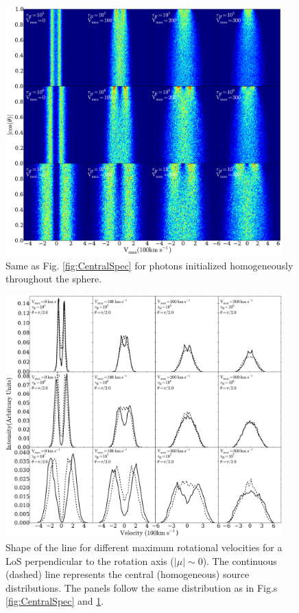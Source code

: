 \documentclass{emulateapj}
\newcommand{\ly}{{\ifmmode{{\rm Ly}\alpha~}\else{Ly$\alpha$~}\fi}}
\begin{document}
\begin{figure}
\begin{center}
  \includegraphics[width=0.95\textwidth]{f3.pdf}
\end{center}
\caption{Same as Fig. \ref{fig:CentralSpec} for \ly photons
  initialized homogeneously throughout the sphere.
    \label{fig:HomSpec}}  
\end{figure}

\begin{figure}
\begin{center}
  \includegraphics[width=0.95\textwidth]{f4.pdf}
\end{center}
\caption{Shape of the \ly line for different maximum rotational
  velocities for a LoS perpendicular to the rotation axis
  ($|\mu|\sim 0$). The continuous (dashed) line represents the central
  (homogeneous) source distributions.  The panels follow the same
  distribution as in Fig.s \ref{fig:CentralSpec} and \ref{fig:HomSpec}.
    \label{fig:differentvelocities}}  
\end{figure}
\end{document}
